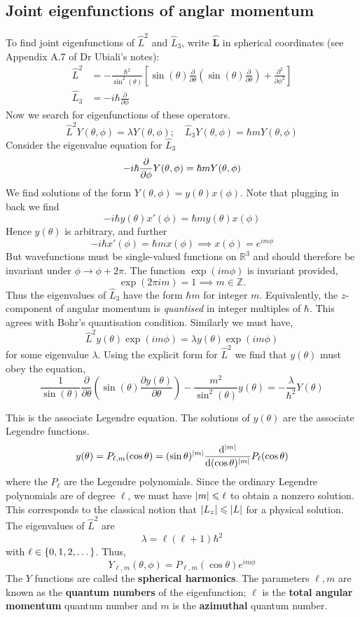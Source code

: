 \documentclass[a4paper]{article}
\begin{document}
\subsection{Joint eigenfunctions of anglar momentum}
To find joint eigenfunctions of $ \hat{L}^2 $ and $ \hat{L}_3 $, write $ \hat{\mathbf{L}} $ in spherical coordinates (see Appendix A.7 of Dr Ubiali's notes): 
\[
	\begin{aligned}
		\hat{L}^2 &=-\frac{\hbar^2}{\sin ^2(\theta)}\left[\sin (\theta) \frac{\partial}{\partial \theta}\left(\sin (\theta) \frac{\partial}{\partial \theta}\right)+\frac{\partial^2}{\partial \phi^2}\right] \\
		\hat{L}_3 &=-i \hbar \frac{\partial}{\partial \phi}
	\end{aligned}
\]
Now we search for eigenfunctions of these operators.
\[
	\hat L^2 Y(\theta, \phi) = \lambda Y(\theta, \phi);\quad \hat L_3 Y(\theta, \phi) = \hbar m Y(\theta, \phi)
\]
Consider the eigenvalue equation for $ \hat L_3 $
\[
	- i \hbar \pdv{}{\phi} Y(\theta,\phi) = \hbar m Y(\theta,\phi)
\] 
We find solutions of the form $ Y(\theta,\phi) = y(\theta) x(\phi) $. Note that plugging in back we find
\[
	-i\hbar y(\theta) x'(\phi) = \hbar m y(\theta) x(\phi)
\]
Hence \( y(\theta) \) is arbitrary, and further
\[
	-i\hbar x'(\phi) = \hbar m x(\phi) \implies x(\phi) = e^{i m \phi}
\]
But wavefunctions must be single-valued functions on $\mathbb{R}^3$ and should therefore be invariant under $\phi \rightarrow \phi+2 \pi$. The function $\exp (i m \phi)$ is invariant provided,
\[
\exp (2 \pi i m)=1  \implies  m \in \mathbb{Z}. 
\]
Thus the eigenvalues of $\hat{L}_3$ have the form $\hbar m$ for integer $m$. Equivalently, the $z$-component of angular momentum is \textit{quantised} in integer multiples of $\hbar$. This agrees with Bohr's quantisation condition.
Similarly we must have,
\[
\hat{L}^2 y(\theta) \exp (i m \phi)=\lambda y(\theta) \exp (i m \phi)
\]
for some eigenvalue $\lambda$. Using the explicit form for $\hat{L}^2$ we find that $y(\theta)$ must obey the equation,
\[
\frac{1}{\sin (\theta)} \frac{\partial}{\partial \theta}\left(\sin (\theta) \frac{\partial y(\theta)}{\partial \theta}\right)-\frac{m^2}{\sin ^2(\theta)} y(\theta)=-\frac{\lambda}{\hbar^2} Y(\theta)
\]

This is the associate Legendre equation.
The solutions of \( y(\theta) \) are the associate Legendre functions.
\[
	y(\theta) = P_{\ell,m}(\cos \theta) = (\sin \theta)^{\abs{m}} \dv[\abs{m}]{(\cos \theta)}  P_\ell(\cos \theta)
\]
where the \( P_\ell \) are the Legendre polynomials.
Since the ordinary Legendre polynomials are of degree \( \ell \), we must have \( \abs{m} \leqslant \ell \) to obtain a nonzero solution.
This corresponds to the classical notion that \( \abs{L_z} \leqslant \abs{L} \) for a physical solution.
The eigenvalues of \( \hat L^2 \) are
\[
	\lambda = \ell(\ell+1) \hbar^2
\]
with \( \ell \in \qty{0, 1, 2, \dots} \).
Thus,
\[
	Y_{\ell, m}(\theta, \phi) = P_{\ell,m}(\cos\theta) e^{im\phi}
\]
The \( Y \) functions are called the \textbf{spherical harmonics}.
The parameters \( \ell, m \) are known as the \textbf{quantum numbers} of the eigenfunction; \( \ell \) is the \textbf{total angular momentum} quantum number and \( m \) is the \textbf{azimuthal} quantum number.
\end{document}
